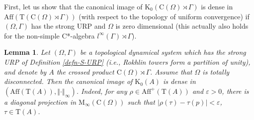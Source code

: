 \documentclass[12pt, oneside, psamsfonts]{amsart}
\newtheorem{lem}[thm]{Lemma}
\theoremstyle{definition}
\theoremstyle{remark}
\numberwithin{equation}{section}
\newcommand{\norm}[1]{\left\Vert#1\right\Vert}
\newcommand{\abs}[1]{\left\vert#1\right\vert}
\newcommand{\eps}{\varepsilon}
\newcommand{\Kzero}{\textrm{K}_0}
\newcommand{\tr}{\mathrm{T}}
\begin{document}
First, let us show that the canonical image of $\Kzero(\mathrm{C}(\Omega) \rtimes \Gamma)$ is dense in $\mathrm{Aff}(\mathrm{T}(\mathrm{C}(\Omega) \rtimes \Gamma))$ (with respect to the topology of uniform convergence) if $(\Omega, \Gamma)$ has the strong URP and $\Omega$ is zero dimensional (this actually also holds for the non-simple C*-algebra $l^\infty(\Gamma) \rtimes \Gamma$).

\begin{lem}\label{dense-range}
Let $(\Omega, \Gamma)$ be a topological dynamical system which has the strong URP of Definition \ref{defn-S-URP} (i.e., Rokhlin towers form a partition of unity), and denote by $A$ the crossed product $\mathrm{C}(\Omega) \rtimes \Gamma$. Assume that $\Omega$ is totally disconnected.
Then the canonical image of $\Kzero(A)$ is dense in $(\mathrm{Aff}(\tr(A)), \norm{\cdot}_\infty)$. Indeed, for any $\rho \in \mathrm{Aff}^+(\tr(A))$ and $\eps>0$, there is a diagonal projection in $\mathrm{M}_\infty(\mathrm{C}(\Omega))$ such that $\abs{\rho(\tau) - \tau(p)} < \eps$, $\tau \in \tr(A)$. %

\end{lem}
\end{document}
